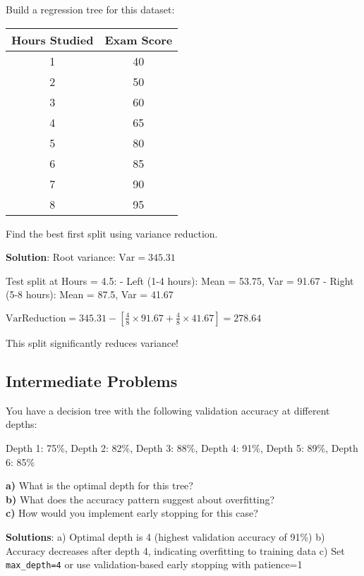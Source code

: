 \documentclass{article}
\newcounter{exercise}
\begin{document}
\begin{tcolorbox}[colback=gray!5!white,colframe=gray!75!black,title=Problem \stepcounter{exercise}\#\theexercise: Regression Tree Construction]

Build a regression tree for this dataset:

\begin{center}
\begin{tabular}{|c|c|}
\hline
\textbf{Hours Studied} & \textbf{Exam Score} \\
\hline
1 & 40 \\
2 & 50 \\
3 & 60 \\
4 & 65 \\
5 & 80 \\
6 & 85 \\
7 & 90 \\
8 & 95 \\
\hline
\end{tabular}
\end{center}

Find the best first split using variance reduction.

\textbf{Solution}:
Root variance: $\text{Var} = 345.31$

Test split at Hours = 4.5:
- Left (1-4 hours): Mean = 53.75, Var = 91.67
- Right (5-8 hours): Mean = 87.5, Var = 41.67

$\text{VarReduction} = 345.31 - [\frac{4}{8} \times 91.67 + \frac{4}{8} \times 41.67] = 278.64$

This split significantly reduces variance!
\end{tcolorbox}

\subsection{Intermediate Problems}

\begin{tcolorbox}[colback=gray!5!white,colframe=gray!75!black,title=Problem \stepcounter{exercise}\#\theexercise: Pruning Analysis]

You have a decision tree with the following validation accuracy at different depths:

Depth 1: 75\%, Depth 2: 82\%, Depth 3: 88\%, Depth 4: 91\%, Depth 5: 89\%, Depth 6: 85\%

\textbf{a)} What is the optimal depth for this tree?\\
\textbf{b)} What does the accuracy pattern suggest about overfitting?\\
\textbf{c)} How would you implement early stopping for this case?

\textbf{Solutions}:
a) Optimal depth is 4 (highest validation accuracy of 91\%)
b) Accuracy decreases after depth 4, indicating overfitting to training data
c) Set \texttt{max\_depth=4} or use validation-based early stopping with patience=1
\end{tcolorbox}
\end{document}
